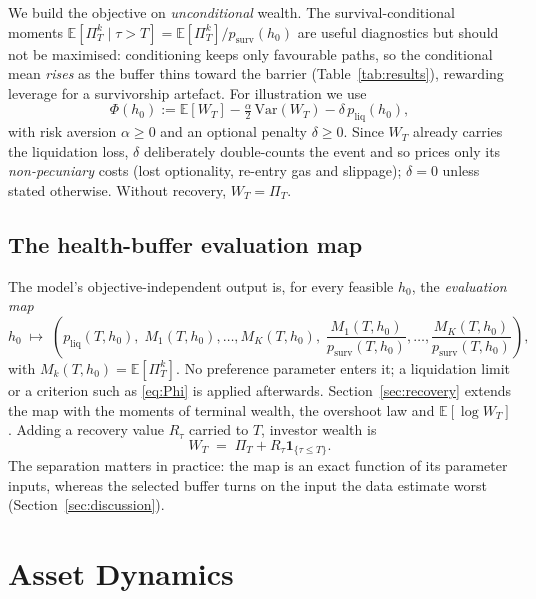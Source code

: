 \documentclass[11pt]{article}
\newcommand{\E}{\mathbb{E}}
\newcommand{\one}{\mathbf{1}}
\theoremstyle{plain}
\theoremstyle{definition}
\theoremstyle{remark}
\begin{document}
We build the objective on \emph{unconditional} wealth. The survival-conditional moments
$\E[\Pi_T^k\mid\tau>T]=\E[\Pi_T^k]/p_{\mathrm{surv}}(h_0)$ are useful diagnostics but should not be
maximised: conditioning keeps only favourable paths, so the conditional mean \emph{rises} as the
buffer thins toward the barrier (Table~\ref{tab:results}), rewarding leverage for a survivorship artefact. For
illustration we use
\begin{equation}\label{eq:Phi}
\Phi(h_0)
:=
\E[W_T]
-
\tfrac{\alpha}{2}\,\mathrm{Var}(W_T)
-
\delta\,p_{\mathrm{liq}}(h_0),
\end{equation}
with risk aversion $\alpha\ge0$ and an optional penalty $\delta\ge0$. Since $W_T$ already carries
the liquidation loss, $\delta$ deliberately double-counts the event and so prices only its
\emph{non-pecuniary} costs (lost optionality, re-entry gas and slippage); $\delta=0$ unless stated
otherwise. Without recovery, $W_T=\Pi_T$.

\subsection{The health-buffer evaluation map}\label{sec:eval-map}

The model's objective-independent output is, for every feasible $h_0$, the \emph{evaluation map}
\begin{equation}\label{eq:eval-map}
h_0 \;\longmapsto\;
\left(
p_{\mathrm{liq}}(T,h_0),\;
M_1(T,h_0),\ldots,M_K(T,h_0),\;
\frac{M_1(T,h_0)}{p_{\mathrm{surv}}(T,h_0)},\ldots,\frac{M_K(T,h_0)}{p_{\mathrm{surv}}(T,h_0)}
\right),
\end{equation}
with $M_k(T,h_0)=\E[\Pi_T^k]$. No preference parameter enters it; a liquidation limit or a criterion
such as \eqref{eq:Phi} is applied afterwards. Section~\ref{sec:recovery} extends the map with the
moments of terminal wealth, the overshoot law and $\E[\log W_T]$. Adding a recovery value $R_\tau$
carried to $T$, investor wealth is
\begin{equation}\label{eq:wealth}
W_T \;=\; \Pi_T + R_\tau\one_{\{\tau\le T\}}.
\end{equation}
The separation matters in practice: the map is an exact function of its parameter inputs, whereas
the selected buffer turns on the input the data estimate worst (Section~\ref{sec:discussion}).

\section{Asset Dynamics}\label{sec:model}
\end{document}
